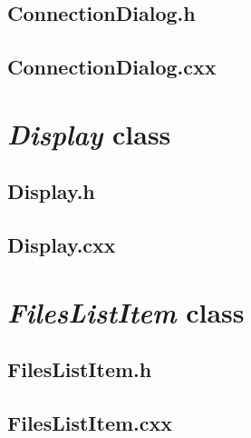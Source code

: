 \subsection{ConnectionDialog.h}


\newpage

\subsection{ConnectionDialog.cxx}


\newpage

\section{\textit{Display} class}

\subsection{Display.h}


\newpage

\subsection{Display.cxx}


\newpage


\section{\textit{FilesListItem} class}

\subsection{FilesListItem.h}


\newpage

\subsection{FilesListItem.cxx}

